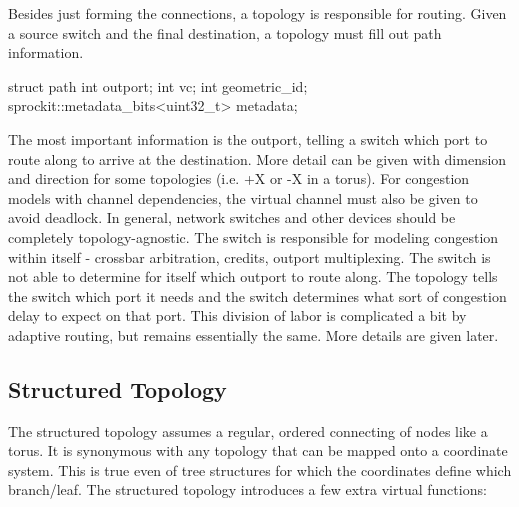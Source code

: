 Besides just forming the connections, a topology is responsible for routing.
Given a source switch and the final destination, a topology must fill out path information.

\begin{CppCode}
struct path {
    int outport;
    int vc;
    int geometric_id;
    sprockit::metadata_bits<uint32_t> metadata;
}
\end{CppCode}

The most important information is the outport, telling a switch which port to route along to arrive at the destination.
More detail can be given with dimension and direction for some topologies (i.e. +X or -X in a torus).
For congestion models with channel dependencies, the virtual channel must also be given to avoid deadlock.
In general, network switches and other devices should be completely topology-agnostic.
The switch is responsible for modeling congestion within itself - crossbar arbitration, credits, outport multiplexing.
The switch is not able to determine for itself which outport to route along.
The topology tells the switch which port it needs and the switch determines what sort of congestion delay to expect on that port.
This division of labor is complicated a bit by adaptive routing, but remains essentially the same.  More details are given later.

\subsection{Structured Topology}
The structured topology assumes a regular, ordered connecting of nodes like a torus.
It is synonymous with any topology that can be mapped onto a coordinate system.
This is true even of tree structures for which the coordinates define which branch/leaf.
The structured topology introduces a few extra virtual functions:

